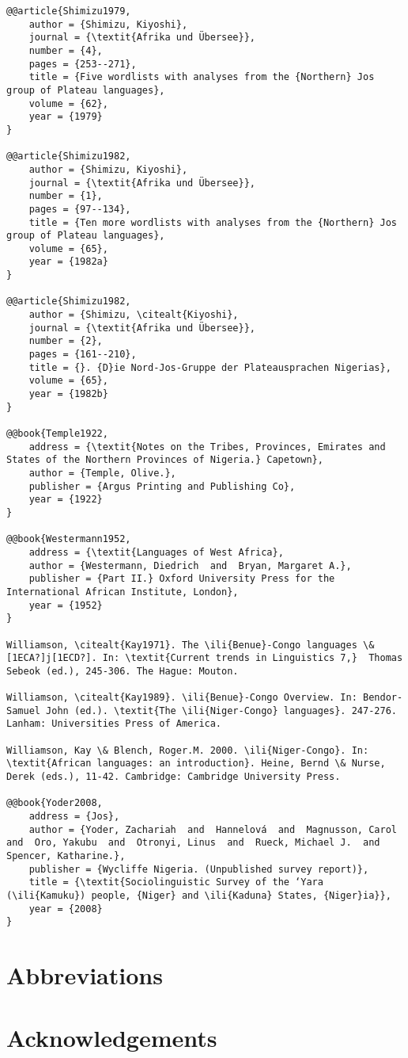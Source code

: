 \documentclass[output=paper]{langsci/langscibook}
\begin{document}
\begin{verbatim}
@@article{Shimizu1979,
	author = {Shimizu, Kiyoshi},
	journal = {\textit{Afrika und Übersee}},
	number = {4},
	pages = {253--271},
	title = {Five wordlists with analyses from the {Northern} Jos group of Plateau languages},
	volume = {62},
	year = {1979}
}

@@article{Shimizu1982,
	author = {Shimizu, Kiyoshi},
	journal = {\textit{Afrika und Übersee}},
	number = {1},
	pages = {97--134},
	title = {Ten more wordlists with analyses from the {Northern} Jos group of Plateau languages},
	volume = {65},
	year = {1982a}
}

@@article{Shimizu1982,
	author = {Shimizu, \citealt{Kiyoshi},
	journal = {\textit{Afrika und Übersee}},
	number = {2},
	pages = {161--210},
	title = {}. {D}ie Nord-Jos-Gruppe der Plateausprachen Nigerias},
	volume = {65},
	year = {1982b}
}

@@book{Temple1922,
	address = {\textit{Notes on the Tribes, Provinces, Emirates and States of the Northern Provinces of Nigeria.} Capetown},
	author = {Temple, Olive.},
	publisher = {Argus Printing and Publishing Co},
	year = {1922}
}

@@book{Westermann1952,
	address = {\textit{Languages of West Africa},
	author = {Westermann, Diedrich  and  Bryan, Margaret A.},
	publisher = {Part II.} Oxford University Press for the International African Institute, London},
	year = {1952}
}

Williamson, \citealt{Kay1971}. The \ili{Benue}-Congo languages \& [1ECA?]j[1ECD?]. In: \textit{Current trends in Linguistics 7,}  Thomas Sebeok (ed.), 245-306. The Hague: Mouton.

Williamson, \citealt{Kay1989}. \ili{Benue}-Congo Overview. In: Bendor-Samuel John (ed.). \textit{The \ili{Niger-Congo} languages}. 247-276. Lanham: Universities Press of America.

Williamson, Kay \& Blench, Roger.M. 2000. \ili{Niger-Congo}. In: \textit{African languages: an introduction}. Heine, Bernd \& Nurse, Derek (eds.), 11-42. Cambridge: Cambridge University Press.

@@book{Yoder2008,
	address = {Jos},
	author = {Yoder, Zachariah  and  Hannelová  and  Magnusson, Carol  and  Oro, Yakubu  and  Otronyi, Linus  and  Rueck, Michael J.  and  Spencer, Katharine.},
	publisher = {Wycliffe Nigeria. (Unpublished survey report)},
	title = {\textit{Sociolinguistic Survey of the ‘Yara (\ili{Kamuku}) people, {Niger} and \ili{Kaduna} States, {Niger}ia}},
	year = {2008}
}

\end{verbatim}
 
\section*{Abbreviations}
\section*{Acknowledgements}
\sloppy
\printbibliography[heading=subbibliography,notkeyword=this] 
\end{document}
